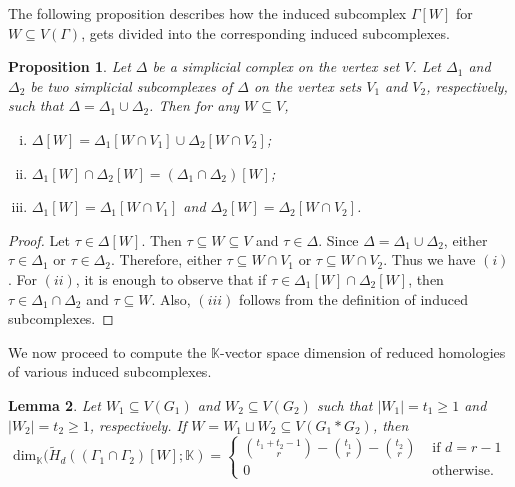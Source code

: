 \documentclass[12pt,reqno]{amsart}
\newtheorem{proposition}{Proposition}[section]
\newtheorem{lemma}[proposition]{Lemma}
\theoremstyle{definition}
\newcommand{\K}{\mathbb K}
\begin{document}
The following proposition describes how the induced subcomplex $\Gamma[W]$ for $W\subseteq V(\Gamma)$, gets divided into the corresponding induced subcomplexes.

\begin{proposition}\label{subcomplex on subset}
    Let $\Delta$ be a simplicial complex on the vertex set $V$. Let $\Delta_1$ and $\Delta_2$ be two simplicial subcomplexes of $\Delta$ on the vertex sets $V_1$ and $V_2$, respectively, such that $\Delta=\Delta_1\cup\Delta_2$. Then for any $W\subseteq V$,
\begin{enumerate}[(i)]
    \item $\Delta[W]=\Delta_1[W\cap V_1]\cup\Delta_2[W\cap V_2]$;
    \item $\Delta_1[W]\cap\Delta_2[W]=(\Delta_1\cap\Delta_2)[W]$;
    \item $\Delta_1[W]=\Delta_1[W\cap V_1]$ and $\Delta_2[W]=\Delta_2[W\cap V_2]$.
\end{enumerate}
\end{proposition}

\begin{proof}
    Let $\tau\in \Delta[W]$. Then $\tau\subseteq W\subseteq V$ and $\tau\in\Delta$. Since $\Delta=\Delta_1\cup\Delta_2$, either $\tau\in\Delta_1$ or $\tau\in\Delta_2$. Therefore, either $\tau\subseteq W\cap V_1$ or $\tau\subseteq W\cap V_2$. Thus we have $(i)$. For $(ii)$, it is enough to observe that if $\tau\in \Delta_1[W]\cap\Delta_2[W]$, then $\tau\in\Delta_1\cap\Delta_2$ and $\tau\subseteq W$. Also, $(iii)$ follows from the definition of induced subcomplexes.
\end{proof}

We now proceed to compute the $\K$-vector space dimension of reduced homologies of various induced subcomplexes.

\begin{lemma}\label{intersection lemma}
    Let $W_1\subseteq V(G_1)$ and $W_2\subseteq V(G_2)$ such that $|W_1|=t_1\ge 1$ and $|W_2|=t_2\ge 1$, respectively. If $W=W_1\sqcup W_2\subseteq V(G_1*G_2)$, then
    {\footnotesize
    \[
    \mathrm{dim}_{\K}(\widetilde H_d((\Gamma_1\cap\Gamma_2)[W];\mathbb K)=\begin{cases}
        {t_1+t_2-1\choose r}-{t_1\choose r}-{t_2\choose r}&\text{ if }d=r-1\\
        0 &\text{ otherwise}.
    \end{cases}
    \]}
\end{lemma}
\end{document}
